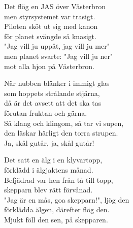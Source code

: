 \documentclass[a6paper,10pt]{article}
\begin{document}
\newpage
\setlength{\oddsidemargin}{-0.37in}
\noindent
\begin{center}
\end{center}
\begin{lyrics}
Det flög en JAS över Västerbron \\
men styrsystemet var trasigt. \\
Piloten sköt ut sig med kanon \\
för planet svängde så knasigt. \\
"Jag vill ju uppåt, jag vill ju mer"\\
men planet svarte: "Jag vill ju ner"\\
mot alla hjon på Västerbron. 
\end{lyrics}

\begin{center}
\end{center}
\begin{lyrics}
När nubben blänker i immigt glas \\
som hoppets strålande stjärna, \\
då är det avsett att det ska tas \\
förutan fruktan och gärna. \\
Så klang och klingom, så tar vi supen, \\
den läskar härligt den torra strupen. \\
Ja, skål gutår, ja, skål gutår! 
\end{lyrics}

\begin{center}
\end{center}
\begin{lyrics}
Det satt en älg i en klyvartopp,\\
förklädd i älgjaktens månad.\\
Befjädrad var hen från tå till topp,\\
skepparn blev rätt förvånad.\\
"Jag är en mås, goa skepparn!", ljög den\\
förklädda älgen, därefter flög den.\\
Mjukt föll den sen, på skepparen.
\end{lyrics}
\end{document}
